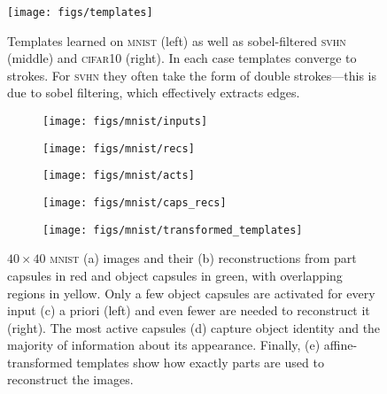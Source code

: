 \begin{figure}
    \centering
    \begin{minipage}[b]{.47\linewidth}
    \texttt{[image: figs/templates]}
    \vspace*{.25em}
    \end{minipage}
    \hfill
    \begin{minipage}[b]{.52\linewidth}
    \caption{Templates learned on \textsc{mnist} (left) as well as sobel-filtered \textsc{svhn} (middle) and \textsc{cifar10} (right). In each case templates converge to strokes. For \textsc{svhn} they often take the form of double strokes---this is due to sobel filtering, which effectively extracts edges.}
    \label{fig:learned_templates}
    \end{minipage}
\end{figure}
\begin{figure}
    \centering
    \begin{subfigure}[c]{.045\linewidth}
        \texttt{[image: figs/mnist/inputs]}
        \caption{}
    \end{subfigure}
    \hfill
    \begin{subfigure}[c]{.045\linewidth}
        \texttt{[image: figs/mnist/recs]}
        \caption{}
    \end{subfigure}
        \hfill
    \begin{subfigure}[c]{.0295\linewidth}
        \texttt{[image: figs/mnist/acts]}
        \caption{}
    \end{subfigure}
    \hfill
    \begin{subfigure}[c]{.09\linewidth}
        \texttt{[image: figs/mnist/caps\_recs]}
        \caption{}
    \end{subfigure}
    \hfill
    \begin{subfigure}[c]{.225\linewidth}
        \texttt{[image: figs/mnist/transformed\_templates]}
        \caption{}
    \end{subfigure}
    \hfill
    \begin{minipage}[c]{.52\linewidth}
        \caption{
        $40\times40$ \textsc{mnist} (a) images and their (b) reconstructions from part capsules in red and object capsules in green, with overlapping regions in yellow.
        Only a few object capsules are activated for every input (c) a priori (left) and even fewer are needed to reconstruct it (right).
        The most active capsules (d) capture object identity and the majority of information about its appearance. 
        Finally, (e) affine-transformed templates show how exactly parts are used to reconstruct the images.
        }
        \label{fig:mnist_rec}
    \end{minipage}
    \vspace*{-1.5em}
\end{figure}
\vspace{-1pt}
